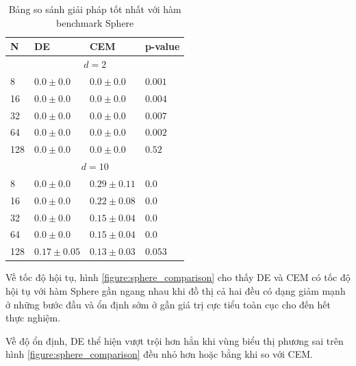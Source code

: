 \documentclass[10pt]{report}
\begin{document}
\begin{table}[H]\centering
	\caption{Bảng so sánh giải pháp tốt nhất với hàm benchmark Sphere}
	\begin{tabularx}{0.8\textwidth}{p{5em}XXl}
		\toprule
		\textbf{N} & \textbf{DE}              & \textbf{CEM}               & \textbf{p-value}   \\
		\midrule
		\multicolumn{4}{c}{\(d = 2\)}                                                           \\
		\midrule
		8          & \(0.0 \pm 0.0\)          & \(0.0 \pm 0.0\)            & \(\mathbf{0.001}\) \\
		16         & \(0.0 \pm 0.0\)          & \(0.0 \pm 0.0\)            & \(\mathbf{0.004}\) \\
		32         & \(0.0 \pm 0.0\)          & \(0.0 \pm 0.0\)            & \(\mathbf{0.007}\) \\
		64         & \(0.0 \pm 0.0\)          & \(0.0 \pm 0.0\)            & \(\mathbf{0.002}\) \\
		128        & \(0.0 \pm 0.0\)          & \(0.0 \pm 0.0\)            & \(0.52\)           \\
		\midrule
		\multicolumn{4}{c}{\(d = 10\)}                                                          \\
		\midrule
		8          & \(\mathbf{0.0 \pm 0.0}\) & \(0.29 \pm 0.11\)          & \(\mathbf{0.0}\)   \\
		16         & \(\mathbf{0.0 \pm 0.0}\) & \(0.22 \pm 0.08\)          & \(\mathbf{0.0}\)   \\
		32         & \(\mathbf{0.0 \pm 0.0}\) & \(0.15 \pm 0.04\)          & \(\mathbf{0.0}\)   \\
		64         & \(\mathbf{0.0 \pm 0.0}\) & \(0.15 \pm 0.04\)          & \(\mathbf{0.0}\)   \\
		128        & \(0.17 \pm 0.05\)        & \(\mathbf{0.13 \pm 0.03}\) & \(0.053\)          \\
		\bottomrule
	\end{tabularx}
\end{table}

Về tốc độ hội tụ, hình \ref{figure:sphere_comparison} cho thấy DE và CEM có tốc độ hội tụ với hàm Sphere gần ngang nhau khi đồ thị cả hai đều có dạng giảm mạnh ở những bước đầu và ổn định sớm ở gần giá trị cực tiểu toàn cục cho đến hết thực nghiệm.

Về độ ổn định, DE thể hiện vượt trội hơn hẳn khi vùng biểu thị phương sai trên hình \ref{figure:sphere_comparison} đều nhỏ hơn hoặc bằng khi so với CEM.
\end{document}
